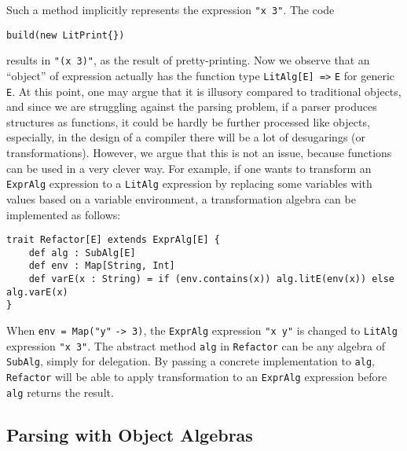 Such a method implicitly represents the expression \lstinline{"x 3"}. The code
\begin{lstlisting}
build(new LitPrint{})
\end{lstlisting}
results in \lstinline{"(x 3)"}, as the result of pretty-printing. Now we observe that an ``object'' of expression actually
has the function type \lstinline{LitAlg[E] =>} \lstinline{E} for generic \lstinline{E}. At this point, one may argue
that it is illusory compared to traditional objects, and since we are struggling against the parsing problem, if a parser
produces structures as functions, it could be hardly be further processed like objects, especially, in the design of a compiler
there will be a lot of desugarings (or transformations). However, we argue that this is not an issue, because functions can be used
in a very clever way. For example, if one wants to transform an \lstinline{ExprAlg} expression to a \lstinline{LitAlg} expression by
replacing some variables with values based on a variable environment, a transformation algebra can be implemented as follows:
\begin{lstlisting}
trait Refactor[E] extends ExprAlg[E] {
    def alg : SubAlg[E]
    def env : Map[String, Int]
    def varE(x : String) = if (env.contains(x)) alg.litE(env(x)) else alg.varE(x)
}
\end{lstlisting}
When \lstinline{env = Map("y"} \lstinline{-> 3)}, the \lstinline{ExprAlg} expression \lstinline{"x y"} is changed to \lstinline{LitAlg} expression \lstinline{"x 3"}. The abstract method
\lstinline{alg} in \lstinline{Refactor} can be any algebra of \lstinline{SubAlg}, simply for delegation. By passing a concrete implementation
to \lstinline{alg}, \lstinline{Refactor} will be able to apply transformation to an \lstinline{ExprAlg} expression before \lstinline{alg} returns the result.

\subsection{Parsing with Object Algebras}\label{subsec:parsingwithoa}

